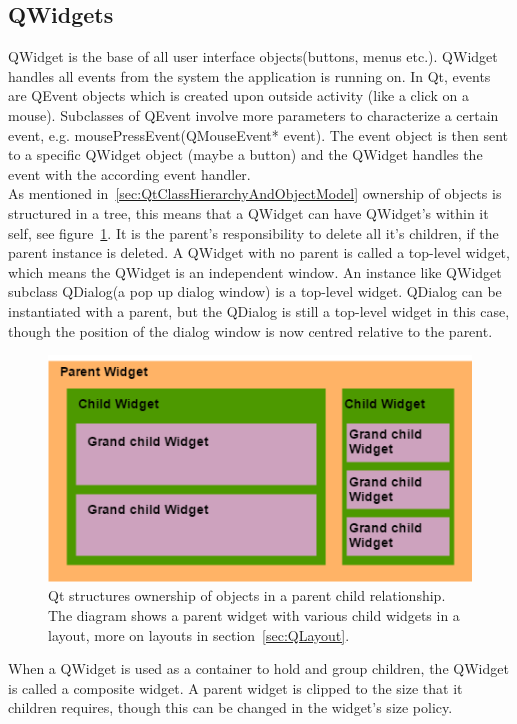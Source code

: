 \subsection{QWidgets}
\label{sec:qwidgets}
QWidget is the base of all user interface objects(buttons, menus etc.). QWidget handles all events from the system the application is running on. In Qt, events are QEvent objects which is created upon outside activity (like a click on a mouse). Subclasses of QEvent involve more parameters to characterize a certain event, e.g. mousePressEvent(QMouseEvent* event). The event object is then sent to a specific QWidget object (maybe a button) and the QWidget handles the event with the according event handler.\\

As mentioned in~\ref{sec:QtClassHierarchyAndObjectModel} ownership of objects is structured in a tree, this means that a QWidget can have QWidget's within it self, see figure~\ref{fig:QWidgetExample}. It is the parent's responsibility to delete all it's children, if the parent instance is deleted. A QWidget with no parent is called a top-level widget, which means the QWidget is an independent window. An instance like QWidget subclass QDialog(a pop up dialog window) is a top-level widget. QDialog can be instantiated with a parent, but the QDialog is still a top-level widget in this case, though the position of the dialog window is now centred relative to the parent.

\begin{figure}[h]
	\centering
	\includegraphics[scale=0.55]{Figures/QWidgetExample.png}
	\caption{Qt structures ownership of objects in a parent child relationship. The diagram shows a parent widget with various child widgets in a layout, more on layouts in section~\ref{sec:QLayout}.}
	\label{fig:QWidgetExample}
\end{figure}

When a QWidget is used as a container to hold and group children, the QWidget is called a composite widget. A parent widget is clipped to the size that it children requires, though this can be changed in the widget's size policy. 

